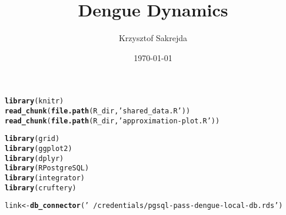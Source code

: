 \documentclass[letterpaper,11pt,oneside,article]{memoir}\usepackage[]{graphicx}\usepackage[]{color}
\title{Dengue Dynamics}
\author{Krzysztof Sakrejda}
\date{\today}  %
\makeatletter
\newcommand{\hlstr}[1]{\textcolor[rgb]{0.192,0.494,0.8}{#1}}%
\newcommand{\hlstd}[1]{\textcolor[rgb]{0.345,0.345,0.345}{#1}}%
\newcommand{\hlkwb}[1]{\textcolor[rgb]{0.69,0.353,0.396}{#1}}%
\newcommand{\hlkwd}[1]{\textcolor[rgb]{0.737,0.353,0.396}{\textbf{#1}}}%
\newenvironment{kframe}{%
 \def\at@end@of@kframe{}%
 \ifinner\ifhmode%
  \def\at@end@of@kframe{\end{minipage}}%
  \begin{minipage}{\columnwidth}%
 \fi\fi%
 \def\FrameCommand##1{\hskip\@totalleftmargin \hskip-\fboxsep
 \colorbox{shadecolor}{##1}\hskip-\fboxsep
     \hskip-\linewidth \hskip-\@totalleftmargin \hskip\columnwidth}%
 \MakeFramed {\advance\hsize-\width
   \@totalleftmargin\z@ \linewidth\hsize
   \@setminipage}}%
 {\par\unskip\endMakeFramed%
 \at@end@of@kframe}
\newenvironment{knitrout}{}{} %
\makeatother
\begin{document}
\maketitle %



\begin{knitrout}
\color{fgcolor}\begin{kframe}
\begin{alltt}
\hlkwd{library}\hlstd{(knitr)}
\hlkwd{read_chunk}\hlstd{(}\hlkwd{file.path}\hlstd{(R_dir,}\hlstr{'shared_data.R'}\hlstd{))}
\hlkwd{read_chunk}\hlstd{(}\hlkwd{file.path}\hlstd{(R_dir,}\hlstr{'approximation-plot.R'}\hlstd{))}
\end{alltt}
\end{kframe}
\end{knitrout}

\begin{knitrout}
\color{fgcolor}\begin{kframe}
\begin{alltt}
\hlkwd{library}\hlstd{(grid)}
\hlkwd{library}\hlstd{(ggplot2)}
\hlkwd{library}\hlstd{(dplyr)}
\hlkwd{library}\hlstd{(RPostgreSQL)}
\hlkwd{library}\hlstd{(integrator)}
\hlkwd{library}\hlstd{(cruftery)}
\end{alltt}
\end{kframe}
\end{knitrout}

\begin{knitrout}
\color{fgcolor}\begin{kframe}
\begin{alltt}
\hlstd{link} \hlkwb{<-} \hlkwd{db_connector}\hlstd{(}\hlstr{'~/credentials/pgsql-pass-dengue-local-db.rds'}\hlstd{)}
\end{alltt}


{\ttfamily\noindent\color{warningcolor}{\#\# Warning: Was not able to allocate a new connection, returned\\\#\# connection has lost its previously pending result.}}\end{kframe}
\end{knitrout}
\end{document}
